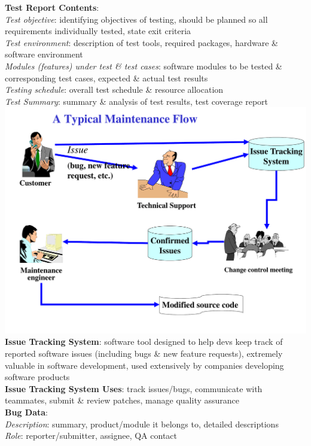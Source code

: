 \documentclass[a4paper]{article}
\begin{document}
\begin{multicols}{3}
        \textbf{Test Report Contents}:\\
        \textit{Test objective}: identifying objectives of testing, should be planned so all requirements individually tested, state exit criteria\\
        \textit{Test environment}: description of test tools, required packages, hardware \& software environment\\
        \textit{Modules (features) under test \& test cases}: software modules to be tested \& corresponding test cases, expected \& actual test results\\
        \textit{Testing schedule}: overall test schedule \& resource allocation\\
        \textit{Test Summary}: summary \& analysis of test results, test coverage report\\
        \includegraphics[width=\linewidth]{355.pdf}\\
        \textbf{Issue Tracking System}: software tool designed to help devs keep track of reported software issues (including bugs \& new feature requests), extremely valuable in software development, used extensively by companies developing software products\\
        \textbf{Issue Tracking System Uses}: track issues/bugs, communicate with teammates, submit \& review patches, manage quality assurance\\
        \textbf{Bug Data}:\\
        \textit{Description}: summary, product/module it belongs to, detailed descriptions\\
        \textit{Role}: reporter/submitter, assignee, QA contact\\

\end{multicols}
\end{document}
